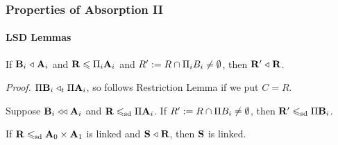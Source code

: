 \documentclass[xcolor=dvipsnames,9pt,hide notes,mathserif]{beamer}
\begin{document}
\begin{frame} \frametitle{Properties of Absorption II}
  \framesubtitle{LSD Lemmas}
    
\begin{lemma}[LSD 1]
\label{lem:gen-abs1}
If $\mathbf{B}_i\mathrel{\triangleleft} \mathbf{A}_i$ and $\mathbf{R} \leqslant \Pi_{i}\mathbf{A}_i$ and $R':= R \cap \Pi_i B_i \neq \emptyset$,
then %
$\mathbf{R}'\mathrel{\triangleleft} \mathbf{R}$.
\end{lemma}
{\it Proof.}  $\Pi \mathbf{B}_i \mathrel{\triangleleft}_t \Pi \mathbf{A}_i$, 
{\small  so follows Restriction Lemma if we put} $C = R$.

  \begin{lemma}[LSD 2]
    \label{lem:sdp-general}
    Suppose $\mathbf{B}_i \mathrel{\triangleleft\triangleleft} \mathbf{A}_i$ and  $\mathbf{R} \leqslant_{\mathrm{sd}} \Pi \mathbf{A}_i$.
    If $R' := R \cap \Pi B_i \neq \emptyset$, then  
    $\mathbf{R}' \leqslant_{\mathrm{sd}} \Pi \mathbf{B}_i$.
  \end{lemma}

  \begin{lemma}[LSD 2]
    \label{lem:linked-absorber}
    If $\mathbf{R} \leqslant_{\mathrm{sd}} \mathbf{A}_0 \times \mathbf{A}_1$ is linked and 
    $\mathbf{S} \mathrel{\triangleleft} \mathbf{R}$, then $\mathbf{S}$ is linked.
  \end{lemma}

  
\end{frame}
\end{document}
